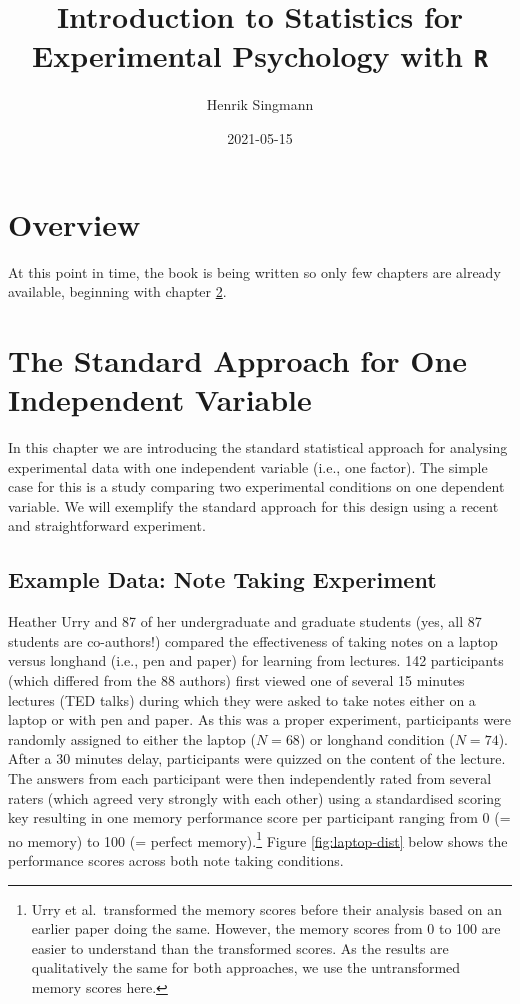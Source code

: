 \documentclass[
]{book}
\title{Introduction to Statistics for Experimental Psychology with \texttt{R}}
\author{Henrik Singmann}
\date{2021-05-15}
\begin{document}
\maketitle

{
\setcounter{tocdepth}{1}
\tableofcontents
}
\hypertarget{overview}{%
\chapter{Overview}\label{overview}}

At this point in time, the book is being written so only few chapters are already available, beginning with chapter \ref{standard1}.

\hypertarget{standard1}{%
\chapter{The Standard Approach for One Independent Variable}\label{standard1}}

In this chapter we are introducing the standard statistical approach for analysing experimental data with one independent variable (i.e., one factor). The simple case for this is a study comparing two experimental conditions on one dependent variable. We will exemplify the standard approach for this design using a recent and straightforward experiment.

\hypertarget{ex:urry}{%
\section{Example Data: Note Taking Experiment}\label{ex:urry}}

Heather Urry and 87 of her undergraduate and graduate students \citep{urry2021} (yes, all 87 students are co-authors!) compared the effectiveness of taking notes on a laptop versus longhand (i.e., pen and paper) for learning from lectures. 142 participants (which differed from the 88 authors) first viewed one of several 15 minutes lectures (TED talks) during which they were asked to take notes either on a laptop or with pen and paper. As this was a proper experiment, participants were randomly assigned to either the laptop (\(N = 68\)) or longhand condition (\(N = 74\)). After a 30 minutes delay, participants were quizzed on the content of the lecture. The answers from each participant were then independently rated from several raters (which agreed very strongly with each other) using a standardised scoring key resulting in one memory performance score per participant ranging from 0 (= no memory) to 100 (= perfect memory).\footnote{Urry et al.~transformed the memory scores before their analysis based on an earlier paper doing the same. However, the memory scores from 0 to 100 are easier to understand than the transformed scores. As the results are qualitatively the same for both approaches, we use the untransformed memory scores here.} Figure \ref{fig:laptop-dist} below shows the performance scores across both note taking conditions.
\end{document}

